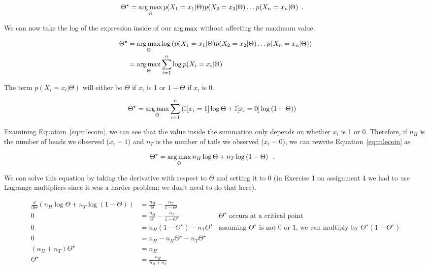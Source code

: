\documentclass{tufte-handout}
\begin{document}
\begin{align}
\Theta^\star &= \operatorname*{arg\,max}_{\Theta} p(X_1 = x_1 | \Theta) p(X_2 = x_2 | \Theta) \ldots p(X_n = x_n | \Theta) \enspace .
\end{align}

We can now take the log of the expression inside of our $\operatorname*{arg\,max}$ without affecting the maximum value.


\begin{align}
\Theta^\star &= \operatorname*{arg\,max}_{\Theta} \log \left ( p(X_1 = x_1 | \Theta) p(X_2 = x_2 | \Theta) \ldots p(X_n = x_n | \Theta) \right) \nonumber \\
&= \operatorname*{arg\,max}_{\Theta} \sum_{i=1}^n \log  p(X_i = x_i | \Theta)
\end{align}

The term $p(X_i = x_i | \Theta)$ will either be $\Theta$ if $x_i$ is 1 or $1-\Theta$ if $x_i$ is 0.

\begin{align}
\Theta^\star &= \operatorname*{arg\,max}_{\Theta} \sum_{i=1}^n \left ( \mathbb{I} [ x_i =1] \log \Theta  + \mathbb{I}[x_i = 0]  \log\left (1-  \Theta \right) \right) \label{eq:mlecoin}
\end{align}

Examining Equation~\ref{eq:mlecoin}, we can see that the value inside the summation only depends on whether $x_i$ is 1 or 0.  Therefore, if $n_{H}$ is the number of heads we observed ($x_i = 1$) and $n_{T}$ is the number of tails we observed ($x_i = 0$), we can rewrite Equation~\ref{eq:mlecoin} as


\begin{align}
\Theta^\star &= \operatorname*{arg\,max}_{\Theta} n_H \log \Theta  + n_T  \log\left (1-  \Theta \right) \label{eq:mlecoincount} \enspace .
\end{align}

We can solve this equation by taking the derivative with respect to $\Theta$ and setting it to 0 (in Exercise 1 on assignment 4 we had to use Lagrange multipliers since it was a harder problem; we don't need to do that here).

\begin{align}
\frac{d}{d\Theta} \left ( n_H \log \Theta  + n_T  \log\left (1-  \Theta \right) \right) &=  \frac{n_H}{\Theta} - \frac{n_T}{1-\Theta} \nonumber \\
0 &= \frac{n_H}{\Theta^\star} - \frac{n_T}{1-\Theta^\star} \nonumber & \mbox{$\Theta^\star$ occurs at a critical point}\\
0 &=  n_H(1-\Theta^\star) - n_T \Theta^\star &\mbox{assuming $\Theta^\star$ is not 0 or 1, we can multiply by $\Theta^\star(1-\Theta^\star)$} \nonumber \\
0&= n_H - n_H \Theta^\star -  n_T \Theta^\star \nonumber \\
(n_H + n_T) \Theta^\star &= n_H \nonumber \\
\Theta^\star &= \frac{n_H}{n_H + n_T} \nonumber \\
\end{align}
\end{document}
